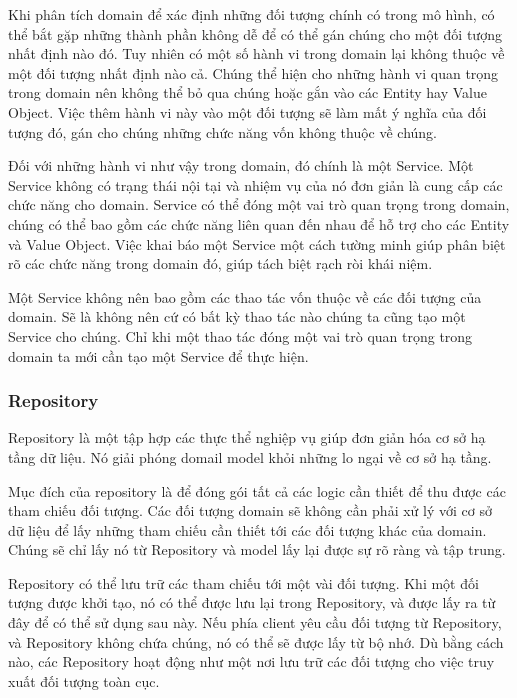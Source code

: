 Khi phân tích domain để xác định những đối tượng chính có trong mô hình, có thể bắt gặp những thành phần không dễ để có thể gán chúng cho một đối tượng nhất định nào đó. Tuy nhiên có một số hành vi trong domain lại không thuộc về một đối tượng nhất định nào cả. Chúng thể hiện cho những hành vi quan trọng trong domain nên không thể bỏ qua chúng hoặc gắn vào các Entity hay Value Object. Việc thêm hành vi này vào một đối tượng sẽ làm mất ý nghĩa của đối tượng đó, gán cho chúng những chức năng vốn không thuộc về chúng.

Đối với những hành vi như vậy trong domain, đó chính là một Service. Một Service không có trạng thái nội tại và nhiệm vụ của nó đơn giản là cung cấp các chức năng cho domain. Service có thể đóng một vai trò quan trọng trong domain, chúng có thể bao gồm các chức năng liên quan đến nhau để hỗ trợ cho các Entity và Value Object. Việc khai báo một Service một cách tường minh giúp phân biệt rõ các chức năng trong domain đó, giúp tách biệt rạch ròi khái niệm.

Một Service không nên bao gồm các thao tác vốn thuộc về các đối tượng của domain. Sẽ là không nên cứ có bất kỳ thao tác nào chúng ta cũng tạo một Service cho chúng. Chỉ khi một thao tác đóng một vai trò quan trọng trong domain ta mới cần tạo một Service để thực hiện.

\subsubsection{Repository}

Repository là một tập hợp các thực thể nghiệp vụ giúp đơn giản hóa cơ sở hạ tầng dữ liệu. Nó giải phóng domail model khỏi những lo ngại về cơ sở hạ tầng.

Mục đích của repository là để đóng gói tất cả các logic cần thiết để thu được các tham chiếu đối tượng. Các đối tượng domain sẽ không cần phải xử lý với cơ sở dữ liệu để lấy những tham chiếu cần thiết tới các đối tượng khác của domain. Chúng sẽ chỉ lấy nó từ Repository và model lấy lại được sự rõ ràng và tập trung.

Repository có thể lưu trữ các tham chiếu tới một vài đối tượng. Khi một đối tượng được khởi tạo, nó có thể được lưu lại trong Repository, và được lấy ra từ đây để có thể sử dụng sau này. Nếu phía client yêu cầu đối tượng từ Repository, và Repository không chứa chúng, nó có thể sẽ được lấy từ bộ nhớ. Dù bằng cách nào, các Repository hoạt động như một nơi lưu trữ các đối tượng cho việc truy xuất đối tượng toàn cục.

